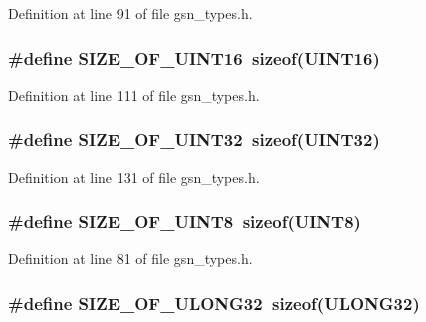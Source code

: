 Definition at line 91 of file gsn\_\-types.h.

\hypertarget{a00599_ad2024c1c99e56ed26a41c381b40038d0}{
\subsubsection[{SIZE\_\-OF\_\-UINT16}]{\setlength{\rightskip}{0pt plus 5cm}\#define SIZE\_\-OF\_\-UINT16~sizeof({\bf UINT16})}}
\label{a00599_ad2024c1c99e56ed26a41c381b40038d0}


Definition at line 111 of file gsn\_\-types.h.

\hypertarget{a00599_aba6ba1193a4f95d3156ea40aa71186e5}{
\subsubsection[{SIZE\_\-OF\_\-UINT32}]{\setlength{\rightskip}{0pt plus 5cm}\#define SIZE\_\-OF\_\-UINT32~sizeof({\bf UINT32})}}
\label{a00599_aba6ba1193a4f95d3156ea40aa71186e5}


Definition at line 131 of file gsn\_\-types.h.

\hypertarget{a00599_a634811c51bc3d3d55b574b3eefc99025}{
\subsubsection[{SIZE\_\-OF\_\-UINT8}]{\setlength{\rightskip}{0pt plus 5cm}\#define SIZE\_\-OF\_\-UINT8~sizeof({\bf UINT8})}}
\label{a00599_a634811c51bc3d3d55b574b3eefc99025}


Definition at line 81 of file gsn\_\-types.h.

\hypertarget{a00599_a5c7f6bdd54401ce871dbb0b691eb5440}{
\subsubsection[{SIZE\_\-OF\_\-ULONG32}]{\setlength{\rightskip}{0pt plus 5cm}\#define SIZE\_\-OF\_\-ULONG32~sizeof({\bf ULONG32})}}
\label{a00599_a5c7f6bdd54401ce871dbb0b691eb5440}


